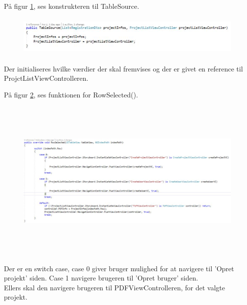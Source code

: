 På figur \ref{fig:TableSource}, ses konstrukteren til TableSource.
\begin{figure}[H] %
	\centering
	\includegraphics[height=2cm, width=15cm]{../ArkitekturDesign/Design/ProjectList/TableSource}
	\caption{}
	\label{fig:TableSource}
\end{figure}
Der initialiseres hvilke værdier der skal fremvises og der er givet en reference til ProjctListViewControlleren.

På figur \ref{fig:RowSelection}, ses funktionen for RowSelected().
\begin{figure}[H] %
	\centering
	\includegraphics[height=8cm, width=17cm]{../ArkitekturDesign/Design/ProjectList/RowSelection}
	\caption{}
	\label{fig:RowSelection}
\end{figure}
Der er en switch case, case 0 giver bruger mulighed for at navigere til 'Opret projekt' siden. Case 1 navigere brugeren til 'Opret bruger' siden. \\
Ellers skal den navigere brugeren til PDFViewControlleren, for det valgte projekt.

\clearpage
